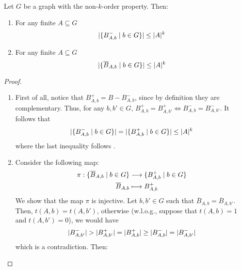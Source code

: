     \begin{corollary}[Claim 2.6.1] \label{cor:k_order_propery_bounds_BAbs}
        Let $G$ be a graph with the non-$k$-order property.
        Then:
        \begin{enumerate}
            \item\label{itm:k_order_propery_bounds_BAbs.1} For any finite $A \subseteq G$
                \[
                    | \{ B^-_{A,b} \mid b \in G \} |
                        \leq |A|^k
                \]
            \item\label{itm:k_order_propery_bounds_BAbs.2} For any finite $A \subseteq G$
                \[
                    | \{ \overline{B}_{A,b} \mid b \in G \} |
                        \leq |A|^k
                \]
        \end{enumerate}
        \begin{proof}
        \begin{enumerate}
            \item First of all, notice that $B^+_{A,b} = B - B^-_{A,b}$, since by definition they are complementary.
                Thus, for any $b, b' \in G$, $B^+_{A,b} = B^+_{A,b'} \Leftrightarrow B^-_{A,b} = B^-_{A,b'}$.
                It follows that
                \[
                    | \{ B^-_{A,b} \mid b \in G \} | =
                    | \{ B^+_{A,b} \mid b \in G \} | \leq |A|^k
                \]
                where the last inequality follows .
            \item Consider the following map:
                \begin{align*}
                    \pi: \{ \overline{B}_{A,b} \mid b \in G \} & \longrightarrow \{ B^+_{A,b} \mid b \in G \} \\
                                                       \overline{B}_{A,b} & \longmapsto B^+_{A,b}
                \end{align*}
                We show that the map $\pi$ is injective.
                Let $b,b' \in G$ such that $\overline{B}_{A,b} = \overline{B}_{A,b'}$.
                Then, $t(A,b) = t(A,b')$, otherwise (w.l.o.g., suppose that $t(A,b) = 1$ and $t(A,b') = 0$), we would have
                \[
                    | B^-_{A,b'} | > | B^+_{A,b'} | = | B^+_{A,b} | \geq
                        | B^-_{A,b} | = | B^-_{A,b'} |
                \]
                which is a contradiction.
                Then:

\end{enumerate}
\end{proof}
\end{corollary}
